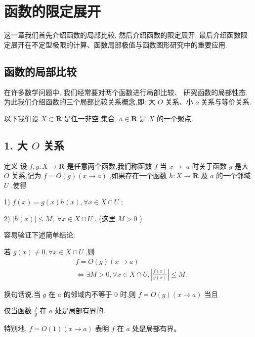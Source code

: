 \chapter{函数的限定展开}

这一章我们首先介绍函数的局部比较, 然后介绍函数的限定展开. 最后介绍函数限定展开在不定型极限的计算、函数局部极值与函数图形研究中的重要应用.

\section{函数的局部比较}

在许多数学问题中, 我们经常要对两个函数进行局部比较、 研究函数的局部性态, 为此我们介绍函数的三个局部比较关系概念,即: 大 $O$ 关系、小 $o$ 关系与等价关系.

以下我们设 $X \subset  \mathbf{R}$ 是任一非空 集合, $a \in  \overline{\mathbf{R}}$ 是 $X$ 的一个聚点.

\section*{1. 大 $O$ 关系}

定义 设 $f,g : X \rightarrow  \mathbf{R}$ 是任意两个函数,我们称函数 $f$ 当 $x \rightarrow$  $a$ 时关于函数 $g$ 是大 $O$ 关系,记为 $f = O\left( g\right) \left( {x \rightarrow  a}\right)$ ,如果存在一个函数 $h : X \rightarrow  \mathbf{R}$ 及 $a$ 的一个邻域 $U$ ,使得

1) $f\left( x\right)  = g\left( x\right) h\left( x\right) ,\forall x \in  X \cap  U$ ;

2) $\left| {h\left( x\right) }\right|  \leq  M,\;\forall x \in  X \cap  U$ . (这里 $M > 0$ )

容易验证下述简单结论:

若 $g\left( x\right)  \neq  0,\forall x \in  X \cap  U$ ,则
\begin{align*}
	&f = O\left( g\right) \left( {x \rightarrow  a}\right)\\
	&\Leftrightarrow  \exists M > 0,\forall x \in  X \cap  U,\left| \frac{f\left( x\right) }{g\left( x\right) }\right|  \leq  M.
\end{align*}

换句话说,当 $g$ 在 $a$ 的邻域内不等于 0 时,则 $f = O\left( g\right) \left( {x \rightarrow  a}\right)$ 当且

仅当函数 $\frac{f}{g}$ 在 $a$ 处是局部有界的.

特别地, $f = O\left( 1\right) \left( {x \rightarrow  a}\right)$ 表明 $f$ 在 $a$ 处是局部有界。


